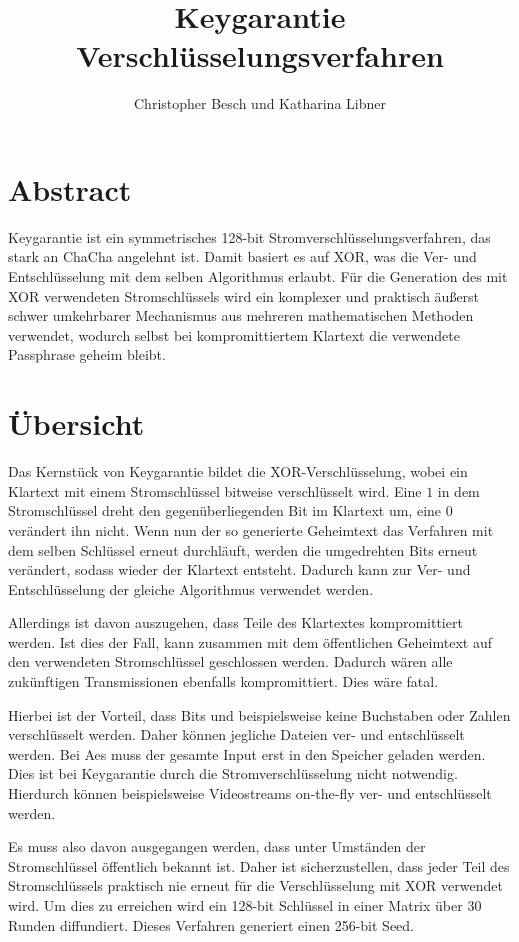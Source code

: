\documentclass[10pt,a4paper]{article}
\author{Christopher Besch und Katharina Libner}
\title{Keygarantie Verschlüsselungsverfahren}
\begin{document}
\maketitle
\tableofcontents
\newpage

\section{Abstract}

Keygarantie ist ein symmetrisches 128-bit Stromverschlüsselungsverfahren, das stark an ChaCha angelehnt ist\cite{Bernstein2008}.
Damit basiert es auf XOR, was die Ver- und Entschlüsselung mit dem selben Algorithmus erlaubt.
Für die Generation des mit XOR verwendeten Stromschlüssels wird ein komplexer und praktisch äußerst schwer umkehrbarer Mechanismus aus mehreren mathematischen Methoden verwendet, wodurch selbst bei kompromittiertem Klartext die verwendete Passphrase geheim bleibt.

\section{Übersicht}

Das Kernstück von Keygarantie bildet die XOR-Verschlüsselung, wobei ein Klartext mit einem Stromschlüssel bitweise verschlüsselt wird.
Eine $1$ in dem Stromschlüssel dreht den gegenüberliegenden Bit im Klartext um, eine $0$ verändert ihn nicht.
Wenn nun der so generierte Geheimtext das Verfahren mit dem selben Schlüssel erneut durchläuft, werden die umgedrehten Bits erneut verändert, sodass wieder der Klartext entsteht.
Dadurch kann zur Ver- und Entschlüsselung der gleiche Algorithmus verwendet werden.

Allerdings ist davon auszugehen, dass Teile des Klartextes kompromittiert werden.
Ist dies der Fall, kann zusammen mit dem öffentlichen Geheimtext auf den verwendeten Stromschlüssel geschlossen werden.
Dadurch wären alle zukünftigen Transmissionen ebenfalls kompromittiert.
Dies wäre fatal.

Hierbei ist der Vorteil, dass Bits und beispielsweise keine Buchstaben oder Zahlen verschlüsselt werden.
Daher können jegliche Dateien ver- und entschlüsselt werden.
Bei Aes muss der gesamte Input erst in den Speicher geladen werden\cite{Pitchaiah2012}.
Dies ist bei Keygarantie durch die Stromverschlüsselung nicht notwendig.
Hierdurch können beispielsweise Videostreams on-the-fly ver- und entschlüsselt werden.

\medskip
Es muss also davon ausgegangen werden, dass unter Umständen der Stromschlüssel öffentlich bekannt ist.
Daher ist sicherzustellen, dass jeder Teil des Stromschlüssels praktisch nie erneut für die Verschlüsselung mit XOR verwendet wird.
Um dies zu erreichen wird ein 128-bit Schlüssel in einer Matrix über 30 Runden diffundiert.
Dieses Verfahren generiert einen 256-bit Seed.
\end{document}
